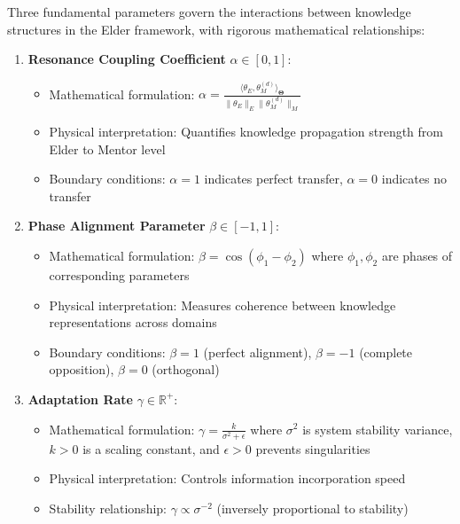 \begin{definition}
\label{def:core_coupling_parameters}
Three fundamental parameters govern the interactions between knowledge structures in the Elder framework, with rigorous mathematical relationships:

\begin{enumerate}
\item \textbf{Resonance Coupling Coefficient} $\alpha \in [0,1]$: 
   \begin{itemize}
   \item Mathematical formulation: $\alpha = \frac{\langle \theta_E, \theta_M^{(d)} \rangle_{\boldsymbol{\Theta}}}{\|\theta_E\|_E \|\theta_M^{(d)}\|_M}$
   \item Physical interpretation: Quantifies knowledge propagation strength from Elder to Mentor level
   \item Boundary conditions: $\alpha = 1$ indicates perfect transfer, $\alpha = 0$ indicates no transfer
   \end{itemize}
    
\item \textbf{Phase Alignment Parameter} $\beta \in [-1,1]$:
   \begin{itemize}
   \item Mathematical formulation: $\beta = \cos(\phi_1 - \phi_2)$ where $\phi_1, \phi_2$ are phases of corresponding parameters
   \item Physical interpretation: Measures coherence between knowledge representations across domains
   \item Boundary conditions: $\beta = 1$ (perfect alignment), $\beta = -1$ (complete opposition), $\beta = 0$ (orthogonal)
   \end{itemize}
    
\item \textbf{Adaptation Rate} $\gamma \in \mathbb{R}^+$:
   \begin{itemize}
   \item Mathematical formulation: $\gamma = \frac{k}{\sigma^2 + \epsilon}$ where $\sigma^2$ is system stability variance, $k > 0$ is a scaling constant, and $\epsilon > 0$ prevents singularities
   \item Physical interpretation: Controls information incorporation speed
   \item Stability relationship: $\gamma \propto \sigma^{-2}$ (inversely proportional to stability)
   \end{itemize}
\end{enumerate}
\end{definition}

